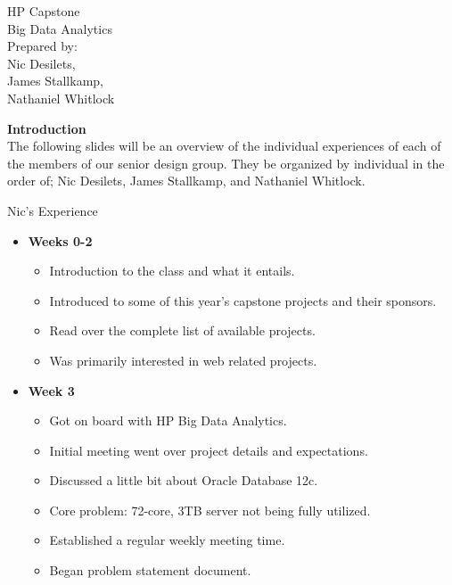 \documentclass[xcolor=dvipsnames]{beamer}
\begin{document}
\begin{frame}
	\begin{center}
		\huge HP Capstone \\
        Big Data Analytics \\
        \small Prepared by: \\
        Nic Desilets, \\
        James Stallkamp, \\
        Nathaniel Whitlock
	\end{center}
\end{frame}

\begin{frame}
	\textbf{Introduction} \\
    The following slides will be an overview of the individual experiences of each of the members of our senior design group.
    They be organized by individual in the order of; Nic Desilets, James Stallkamp, and Nathaniel Whitlock.
\end{frame}

\begin{frame}
	\begin{center}
		\huge Nic's Experience
    \end{center}
\end{frame}

\begin{frame}
\begin{itemize}
	\item \textbf{Weeks 0-2}
    \begin{itemize}
  		\item Introduction to the class and what it entails.
        \item Introduced to some of this year's capstone projects and their sponsors.
        \item Read over the complete list of available projects.
        \item Was primarily interested in web related projects.
        
	\end{itemize}
\end{itemize}
\end{frame}

\begin{frame}
\begin{itemize}
    \item \textbf{Week 3}
    \begin{itemize}
  	    \item Got on board with HP Big Data Analytics.
        \item Initial meeting went over project details and expectations.
        \item Discussed a little bit about Oracle Database 12c.
        \item Core problem: 72-core, 3TB server not being fully utilized.
        \item Established a regular weekly meeting time.
        \item Began problem statement document.
    \end{itemize}
\end{itemize}
\end{frame}
\end{document}
